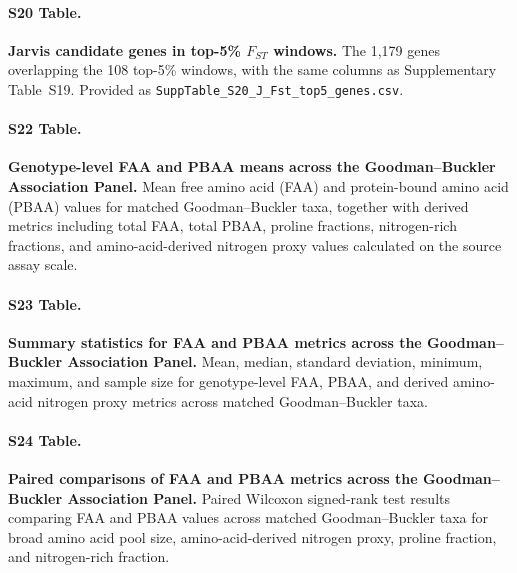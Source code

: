 \paragraph*{S20 Table.}
\makeatletter
\def\@currentlabelname{S20 Table}
\makeatother
\label{S20_Table}
\textbf{Jarvis candidate genes in top-5\% $F_{ST}$ windows.} The 1,179 genes overlapping the 108 top-5\% windows, with the same columns as Supplementary Table~S19. Provided as \texttt{SuppTable\_S20\_J\_Fst\_top5\_genes.csv}.

\paragraph*{S22 Table.}
\makeatletter
\def\@currentlabelname{S22 Table}
\makeatother
\label{S22_Table}
\textbf{Genotype-level FAA and PBAA means across the Goodman--Buckler Association Panel.} Mean free amino acid (FAA) and protein-bound amino acid (PBAA) values for matched Goodman--Buckler taxa, together with derived metrics including total FAA, total PBAA, proline fractions, nitrogen-rich fractions, and amino-acid-derived nitrogen proxy values calculated on the source assay scale.

\paragraph*{S23 Table.}
\makeatletter
\def\@currentlabelname{S23 Table}
\makeatother
\label{S23_Table}
\textbf{Summary statistics for FAA and PBAA metrics across the Goodman--Buckler Association Panel.} Mean, median, standard deviation, minimum, maximum, and sample size for genotype-level FAA, PBAA, and derived amino-acid nitrogen proxy metrics across matched Goodman--Buckler taxa.

\paragraph*{S24 Table.}
\makeatletter
\def\@currentlabelname{S24 Table}
\makeatother
\label{S24_Table}
\textbf{Paired comparisons of FAA and PBAA metrics across the Goodman--Buckler Association Panel.} Paired Wilcoxon signed-rank test results comparing FAA and PBAA values across matched Goodman--Buckler taxa for broad amino acid pool size, amino-acid-derived nitrogen proxy, proline fraction, and nitrogen-rich fraction.

